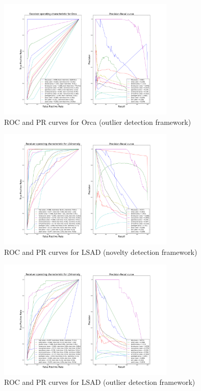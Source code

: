 \begin{figure}[!ht]
    \caption{\acs{ROC} and \acs{PR} curves for Orca (outlier detection
    framework)}
    \label{ocrf:fig:orca_roc_pr_unsupervised}
    \centering
    \includegraphics[trim=175 80 175 123, clip,
    width=0.75\textwidth]{./gfx/bench_orca_roc_pr_unsupervised_factorized.png}
\end{figure}
\begin{figure}[!ht]
    \caption{\acs{ROC} and \acs{PR} curves for \acs{LSAD} (novelty detection
    framework)}
    \label{ocrf:fig:LSAnomaly_roc_pr}
    \centering
    \includegraphics[trim=175 80 175 123, clip,
    width=0.75\textwidth]{./gfx/bench_LSAnomaly_roc_pr_supervised_factorized.png}
\end{figure}
\begin{figure}[!ht]
    \caption{\acs{ROC} and \acs{PR} curves for \acs{LSAD} (outlier detection
    framework)}
    \label{ocrf:fig:LSAnomaly_roc_pr_unsupervised}
    \centering
    \includegraphics[trim=175 80 175 123, clip,
    width=0.75\textwidth]{./gfx/bench_LSAnomaly_roc_pr_unsupervised_factorized.png}
\end{figure}

